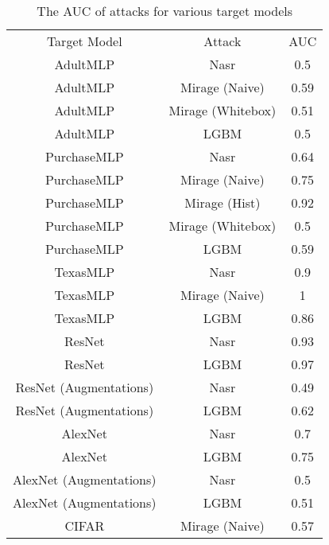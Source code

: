 
\begin{table}[]
    \centering
    \caption{The AUC of attacks for various target models}
    \begin{tabular}{c|c|c}
    Target Model & Attack & AUC \\
    AdultMLP    &    Nasr    &    0.5 \\
    AdultMLP    &    Mirage (Naive)    &    0.59 \\
    AdultMLP    &    Mirage (Whitebox)    &    0.51 \\
    AdultMLP    &    LGBM    &    0.5 \\
    \hline
    PurchaseMLP    &    Nasr    &    0.64 \\
    PurchaseMLP    &    Mirage (Naive)    &    0.75 \\
    PurchaseMLP    &    Mirage (Hist)    &    0.92 \\
    PurchaseMLP    &    Mirage (Whitebox)    &    0.5 \\
    PurchaseMLP    &    LGBM    &    0.59 \\
    \hline
    TexasMLP    &    Nasr    &    0.9 \\
    TexasMLP    &    Mirage (Naive)    &    1 \\
    TexasMLP    &    LGBM    &    0.86 \\
    \hline
    ResNet    &    Nasr    &    0.93 \\
    ResNet    &    LGBM    &    0.97 \\
    ResNet (Augmentations)    &    Nasr    &    0.49 \\
    ResNet (Augmentations)    &    LGBM    &    0.62 \\
    AlexNet     &    Nasr    &    0.7 \\
    AlexNet     &    LGBM    &    0.75 \\
    AlexNet (Augmentations)    &    Nasr    &    0.5 \\
    AlexNet (Augmentations)    &    LGBM    &    0.51 \\
    CIFAR    &    Mirage (Naive)    &    0.57 \\
    \end{tabular}
    \label{tab:attacks}
\end{table}
